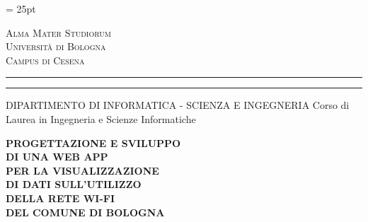 \oddsidemargin = 25pt

\begin{titlepage}
    \begin{center}
    {
        {\Large{\textsc{Alma Mater Studiorum}}} \\
        {\Large{\textsc{Università di Bologna}}} \\
        {\textsc{Campus di Cesena}}
        \vspace{-1mm}
    }
    \end{center}
    \begin{center}
    {
        \rule[0.1cm]{\textwidth}{0.1mm}
        \rule[0.5cm]{\textwidth}{0.6mm}
        DIPARTIMENTO DI INFORMATICA - SCIENZA E INGEGNERIA
        Corso di Laurea in Ingegneria e Scienze Informatiche
    }
    \end{center}

    \vspace{20mm} %

    \begin{center}
        {\LARGE{\textbf{PROGETTAZIONE E SVILUPPO}}} \\
        \vspace{4mm}
        {\LARGE{\textbf{DI UNA WEB APP}}} \\
        \vspace{4mm}
        {\LARGE{\textbf{PER LA VISUALIZZAZIONE}}} \\
        \vspace{4mm}
        {\LARGE{\textbf{DI DATI SULL'UTILIZZO}}} \\
        \vspace{4mm}
        {\LARGE{\textbf{DELLA RETE WI-FI}}} \\
        \vspace{4mm}
        {\LARGE{\textbf{DEL COMUNE DI BOLOGNA}}}
    \end{center}


\end{titlepage}
